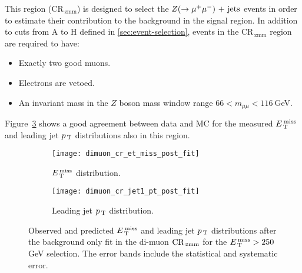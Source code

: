 This region (CR$_\mathrm{\, zmm}$) is designed to select the $Z (\rightarrow \mu^+ \mu^-)\mathrm{~+~jets}$
events in order to estimate their contribution to the background in the signal
region. In addition to cuts from A to H defined in \cref{sec:event-selection},
events in the CR$_\mathrm{\, zmm}$ region are required to have:
\begin{itemize}
\item Exactly two good muons.
\item Electrons are vetoed.
\item An invariant mass in the $Z$ boson mass window range
  $66 < m_{\mu \mu} < 116~$GeV.
\end{itemize}
Figure~\ref{fig:dimuon_cr_plots} shows a good agreement between data and MC for
the measured $E_\mathrm{\, T}^\mathrm{\, miss}$ and leading jet $p_\mathrm{\, T}$ distributions also in this region.
\begin{figure}[!h]
  \centering
  \begin{subfigure}[t]{.48\linewidth}
    \texttt{[image: dimuon\_cr\_et\_miss\_post\_fit]}
    \caption{$E_\mathrm{\, T}^\mathrm{\, miss}$ distribution.}
    \label{fig:dimuon_cr_et_miss_pre_fit}
  \end{subfigure}
  \begin{subfigure}[t]{.48\linewidth}
    \texttt{[image: dimuon\_cr\_jet1\_pt\_post\_fit]}
    \caption{Leading jet $p_\mathrm{\, T}$ distribution.}
    \label{fig:dimuon_cr_jet1_pt_pre_fit}
  \end{subfigure}
  \caption{Observed and predicted $E_\mathrm{\, T}^\mathrm{\, miss}$ and leading jet $p_\mathrm{\, T}$ distributions
    after the background only fit in the di-muon $\mathrm{CR}_\mathrm{\, zmm}$ for the
    $E_\mathrm{\, T}^\mathrm{\, miss} > 250~$GeV selection. The error bands include the statistical and
    systematic error.}
  \label{fig:dimuon_cr_plots}
\end{figure}
